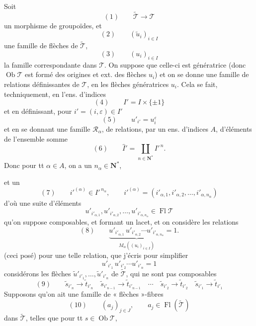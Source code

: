 \documentclass[11pt,a4paper]{article}
\begin{document}
Soit \struck{\ill{}}
\[
  (1) \qquad \widetilde{\mathcal{T}} \longrightarrow \mathcal{T}
\]
un morphisme de groupoïdes, et
\[
  (2) \qquad (\tilde{u}_i)_{i \in I}
\]
une famille de flèches de $\widetilde{\mathcal{T}}$,
\[
  (3) \qquad (u_i)_{i \in I}
\]
la famille correspondante dans $\mathcal{T}$. On suppose que celle-ci est génératrice
(donc $\operatorname{Ob}\mathcal{T}$ est formé des origines et ext. des flèches $u_i$) et on se
donne une famille  de relations définissantes de $\mathcal{T}$, en les
flèches génératrices $u_i$. Cela se fait, techniquement, en 
l'ens. d'indices
\[
  (4) \qquad I' = I \times \{\pm 1\}
\]
et en définissant, pour $i' = (i, \varepsilon) \in I'$
\[
  (5) \qquad u'_{i'} = u_i^{\varepsilon}
\]
et en se donnant une famille $\mathcal{R}_\alpha$, de relations,  par un
ens. d'indices $A$, d'éléments de l'ensemble somme
\[
  (6) \qquad \hat{I}' = \coprod_{n \in \mathbf{N}^*} I'^{\,n} .
\]
Donc pour tt $\alpha \in A$, on a un $n_\alpha \in \mathbf{N}^*$,

et un
\[
  (7) \qquad i'^{(\alpha)} \in I'^{\,n_\alpha}, \qquad
  i'^{(\alpha)} = (i'_{\alpha,1}, i'_{\alpha,2}, \ldots, i'_{\alpha,n_\alpha})
\]
d'où une suite d'éléments
\[
  u'_{i'_{\alpha,1}}, u'_{i'_{\alpha,2}}, \ldots, u'_{i'_{\alpha,n_\alpha}} \in \operatorname{Fl}\mathcal{T}
\]
qu'on suppose composables, \struck{\ill{}} et formant un lacet, \struck{\ill{}} et on considère
les relations
\[
  (8) \qquad \underbrace{u'_{i'_{\alpha,1}}\, u'_{i'_{\alpha,2}} \cdots u'_{i'_{\alpha,n_\alpha}}}_{M_\alpha((u_i)_{i \in I})} = 1 .
\]
(ceci posé) pour une telle relation,  que j'écris pour
simplifier
\[
  u'_{i'_1}\, u'_{i'_2} \cdots u'_{i'_n} = 1
\]
considérons les flèches 
$\tilde{u}'_{i'_1}, \ldots, \tilde{u}'_{i'_n}$ de $\widetilde{\mathcal{T}}$, qui ne sont pas
 composables
\[
  (9) \qquad
  \tilde{s}_{i'_n} \to \tilde{t}_{i'_n} \quad
  \tilde{s}_{i'_{n-1}} \to \tilde{t}_{i'_{n-1}} \quad \cdots \quad
  \tilde{s}_{i'_2} \to \tilde{t}_{i'_2} \quad
  \tilde{s}_{i'_1} \to \tilde{t}_{i'_1}
\]
 Supposons qu'on ait une famille de « flèches »-fibres
 
\[
  (10) \qquad (a_j)_{j \in J}, \qquad a_j \in \operatorname{Fl}(\widetilde{\mathcal{T}})
\]
dans $\widetilde{\mathcal{T}}$, telles que pour tt $s \in \operatorname{Ob}\mathcal{T}$,
\end{document}
